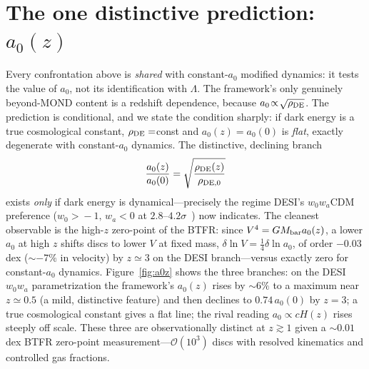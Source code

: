 \documentclass[aps,prd,twocolumn,10pt,nofootinbib,superscriptaddress]{revtex4-2}
\begin{document}
\section{The one distinctive prediction: $a_0(z)$}
Every confrontation above is \emph{shared} with constant-$a_0$ modified dynamics: it tests the value of $a_0$, not
its identification with $\Lambda$. The framework's only genuinely beyond-MOND content is a redshift dependence,
because $a_0\!\propto\!\sqrt{\rho_{\rm DE}}$. The prediction is conditional, and we state the condition sharply:
if dark energy is a true cosmological constant, $\rho_{\rm DE}=$const and $a_0(z)=a_0(0)$ is \emph{flat}, exactly
degenerate with constant-$a_0$ dynamics. The distinctive, declining branch
\begin{equation}
\frac{a_0(z)}{a_0(0)}=\sqrt{\frac{\rho_{\rm DE}(z)}{\rho_{\rm DE,0}}}
\label{eq:a0z}
\end{equation}
exists \emph{only} if dark energy is dynamical---precisely the regime DESI's $w_0w_a$CDM preference
($w_0\!>\!-1,\,w_a\!<\!0$ at $2.8$--$4.2\sigma$~\cite{DESI2025}) now indicates. The cleanest observable is the high-$z$
zero-point of the BTFR: since $V^4=GM_{\rm bar}a_0(z)$, a lower $a_0$ at high $z$ shifts discs to lower $V$ at fixed
mass, $\delta\ln V=\tfrac14\delta\ln a_0$, of order $-0.03$ dex ($\sim-7\%$ in velocity) by $z\!\simeq\!3$ on the
DESI branch---versus exactly zero for constant-$a_0$ dynamics. Figure~\ref{fig:a0z} shows the three branches: on the
DESI $w_0w_a$ parametrization the framework's $a_0(z)$ rises by $\sim6\%$ to a maximum near $z\!\simeq\!0.5$ (a mild,
distinctive feature) and then declines to $0.74\,a_0(0)$ by $z\!=\!3$; a true cosmological constant gives a flat
line; the rival reading $a_0\!\propto\!cH(z)$ rises steeply off scale. These three are observationally distinct at
$z\!\gtrsim\!1$ given a $\sim0.01$ dex BTFR zero-point measurement---$\mathcal{O}(10^3)$ discs with resolved
kinematics and controlled gas fractions.
\end{document}
